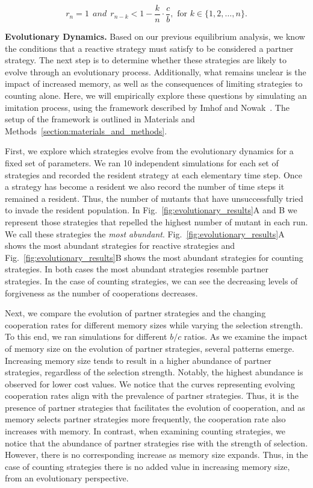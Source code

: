 \documentclass[11pt]{article}
\begin{document}
\begin{equation}
  r_n = 1 ~~and~~ r_{n - k} < 1 - \frac{k}{n} \cdot \frac{c}{b}, \text{ for } k \in \{1, 2, \dots, n\}.
\end{equation}


\textbf{Evolutionary Dynamics.}
Based on our previous equilibrium analysis, we know the conditions that a
reactive strategy must satisfy to be considered a partner strategy. The next
step is to determine whether these strategies are likely to evolve through an
evolutionary process. Additionally, what remains unclear is the impact of
increased memory, as well as the consequences of limiting strategies to counting
alone. Here, we will empirically explore these questions by simulating an
imitation process, using the framework described by Imhof and
Nowak~\cite{imhof:royal:2010}. The setup of the framework is outlined in
Materials and Methods~\ref{section:materials_and_methods}.

First, we explore which strategies evolve from the evolutionary dynamics for a
fixed set of parameters. We ran 10 independent simulations for each set of
strategies and recorded the resident strategy at each elementary time step. Once
a strategy has become a resident we also record the number of time steps it
remained a resident. Thus, the number of mutants that have unsuccessfully tried
to invade the resident population. In Fig.~\ref{fig:evolutionary_results}A and B
we represent those strategies that repelled the highest number of mutant in each
run. We call these strategies the {\it most abundant}.
Fig.~\ref{fig:evolutionary_results}A shows the most abundant strategies for
reactive strategies and Fig.~\ref{fig:evolutionary_results}B shows the most
abundant strategies for counting strategies. In both cases the most abundant
strategies resemble partner strategies. In the case of counting strategies, we
can see the decreasing levels of forgiveness as the number of cooperations
decreases.

Next, we compare the evolution of partner strategies and the changing
cooperation rates for different memory sizes while varying the selection
strength. To this end, we ran simulations for different $b/c$ ratios.
As we examine the impact of memory size on the evolution of partner
strategies, several patterns emerge. Increasing memory size tends to result
in a higher abundance of partner strategies, regardless of the selection
strength. Notably, the highest abundance is observed for lower cost values. We
notice that the curves representing evolving cooperation rates align with the
prevalence of partner strategies. Thus, it is the presence of partner strategies
that facilitates the evolution of cooperation, and as memory selects partner
strategies more frequently, the cooperation rate also increases with memory.
In contrast, when examining
counting strategies, we notice that the abundance of partner strategies rise
with the strength of selection. However, there is no corresponding increase as
memory size expands. Thus, in the case of counting strategies there is no added
value in increasing memory size, from an evolutionary perspective.
\end{document}
